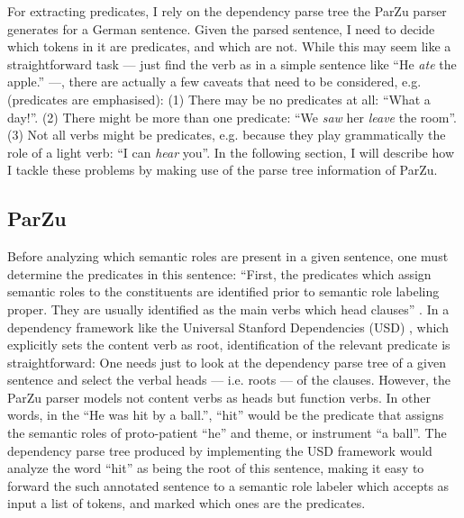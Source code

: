 For extracting predicates, I rely on the dependency parse tree the ParZu parser
\cite{sennrich2013exploiting} generates for a German sentence. Given the parsed
sentence, I need to decide which tokens in it are predicates, and which are not.
While this may seem like a straightforward task --- just find the verb as in a
simple sentence like ``He \emph{ate} the apple.'' ---, there are actually a few
caveats that need to be considered, e.g. (predicates are emphasised): (1) There
may be no predicates at all: ``What a day!''. (2) There might be more than one
predicate: ``We \emph{saw} her \emph{leave} the room''. (3) Not all verbs might
be predicates, e.g. because they play grammatically the role of a light verb: ``I
can \emph{hear} you''. In the following section, I will describe how I tackle
these problems by making use of the parse tree information of ParZu.


\subsection{ParZu}


Before analyzing which semantic roles are present in a given sentence, one
must determine the predicates in this sentence: ``First, the predicates which
assign semantic roles to the constituents are identified prior to semantic
role labeling proper. They are usually identified as the main verbs which
head clauses'' \citep[p.~74]{samardzic2013dynamics}. In a dependency framework
like the Universal Stanford Dependencies (USD) \citep{de2014universal},
which explicitly sets the content verb as root, identification of the
relevant predicate is straightforward: One needs just to look at the dependency
parse tree of a given sentence and select the verbal heads --- i.e. roots ---
of the clauses. However, the ParZu parser models not content verbs as heads but
function verbs. In other words,
in the ``He was hit by a ball.'', ``hit'' would be the predicate that assigns
the semantic roles of proto-patient ``he'' and theme, or instrument ``a ball''.
The dependency parse tree produced by implementing the USD framework would
analyze the word ``hit'' as being the root of this sentence, making it easy to
forward the such annotated sentence to a semantic role labeler which accepts as
input a list of tokens, and marked which ones are the predicates.


